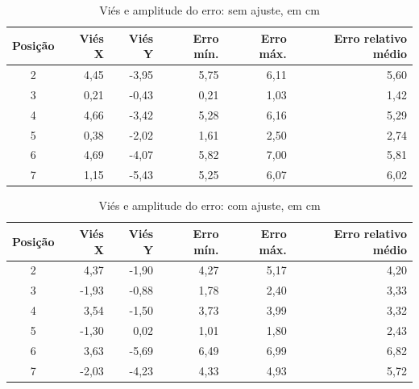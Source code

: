 \begin{table}[H]\centering\caption{Viés e amplitude do erro: sem ajuste, em cm}\label{tab:vies-sem_ajuste}\small\begin{tabular}{crrrrr}\toprule Posição & Viés X & Viés Y & Erro mín. & Erro máx. & Erro relativo médio\\\midrule
2 & 4,45 & -3,95 & 5,75 & 6,11 & 5,60\\
3 & 0,21 & -0,43 & 0,21 & 1,03 & 1,42\\
4 & 4,66 & -3,42 & 5,28 & 6,16 & 5,29\\
5 & 0,38 & -2,02 & 1,61 & 2,50 & 2,74\\
6 & 4,69 & -4,07 & 5,82 & 7,00 & 5,81\\
7 & 1,15 & -5,43 & 5,25 & 6,07 & 6,02\\
\bottomrule\end{tabular}\par{}\end{table}
\begin{table}[H]\centering\caption{Viés e amplitude do erro: com ajuste, em cm}\label{tab:vies-com_ajuste}\small\begin{tabular}{crrrrr}\toprule Posição & Viés X & Viés Y & Erro mín. & Erro máx. & Erro relativo médio\\\midrule
2 & 4,37 & -1,90 & 4,27 & 5,17 & 4,20\\
3 & -1,93 & -0,88 & 1,78 & 2,40 & 3,33\\
4 & 3,54 & -1,50 & 3,73 & 3,99 & 3,32\\
5 & -1,30 & 0,02 & 1,01 & 1,80 & 2,43\\
6 & 3,63 & -5,69 & 6,49 & 6,99 & 6,82\\
7 & -2,03 & -4,23 & 4,33 & 4,93 & 5,72\\
\bottomrule\end{tabular}\par{}\end{table}